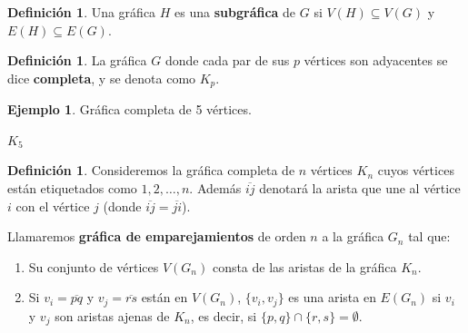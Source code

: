\documentclass[12pt]{book}
\theoremstyle{definition}
\newtheorem{definition}[theorem]{Definición}
\newtheorem{example}[theorem]{Ejemplo}
\newcounter{in}
\newcounter{ini}
\begin{document}
\begin{definition}
  \label{sub_graph}
  Una gráfica $H$ es una \textbf{subgráfica} de $G$ si
  $V(H) \subseteq V(G)$ y $E(H) \subseteq E(G)$.
\end{definition}

\begin{definition}
  \label{complete_graph}
  La gráfica $G$ donde cada par de sus $p$ vértices son adyacentes se
  dice \textbf{completa}, y se denota como $K_{p}$.
\end{definition}
\begin{example}
  Gráfica completa de 5 vértices.
  \bigskip

  \begin{minipage}{1.0\linewidth}
    \centering
  
    $K_{5}$
  \end{minipage}
  \label{fig:K5}
\end{example}

\begin{definition}
  \label{graf-emparejamientos}
  Consideremos la gráfica completa de $n$ vértices $K_{n}$ cuyos
  vértices están etiquetados como $1,2,\ldots,n$. Además
  $\overline{ij}$ denotará la arista que une al vértice $i$ con el
  vértice $j$ (donde $\overline{ij}=\overline{ji}$).
  
  Llamaremos \textbf{gráfica de emparejamientos} de orden $n$ a la
  gráfica $G_{n}$ tal que:
  
  \begin{enumerate}
  \item Su conjunto de vértices $V(G_{n})$ consta de las aristas de la gráfica
    $K_{n}$. 
  \item Si $v_{i}=\overline{pq}$ y $v_{j}=\overline{rs}$ están en
    $V(G_{n})$, $\{v_{i},v_{j}\}$ es una arista en $E(G_{n})$ si $v_{i}$
    y $v_{j}$ son aristas ajenas de $K_{n}$, es decir, si $\{p,q\}\cap\{r,s\}=\emptyset$.
  \end{enumerate}
\end{definition} 
\end{document}

